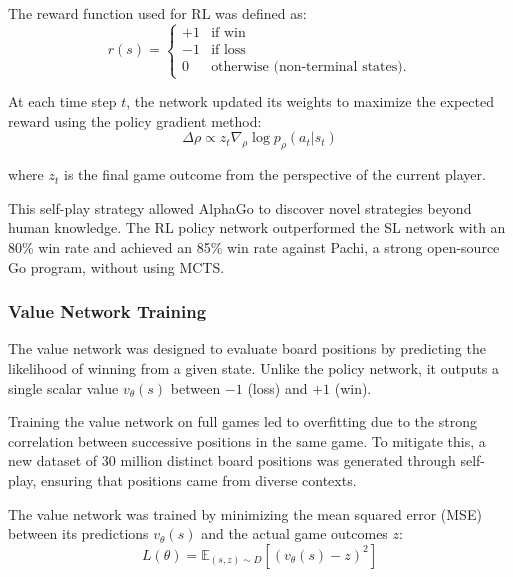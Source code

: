 The reward function used for RL was defined as:
\begin{equation}
    r(s) =
    \begin{cases}
        +1 & \text{if win}                           \\
        -1 & \text{if loss}                          \\
        0  & \text{otherwise (non-terminal states).}
    \end{cases}
\end{equation}

At each time step \( t \), the network updated its weights to maximize the
expected reward using the policy gradient method:
\begin{equation}
    \Delta \rho \propto z_t \nabla_\rho \log p_\rho(a_t | s_t)
\end{equation}

where \( z_t \) is the final game outcome from the perspective of the current
player.

This self-play strategy allowed AlphaGo to discover novel strategies beyond
human knowledge. The RL policy network outperformed the SL network with an 80\%
win rate and achieved an 85\% win rate against Pachi, a strong open-source Go
program, without using MCTS.

\subsubsection{Value Network Training}
The value network was designed to evaluate board positions by predicting the
likelihood of winning from a given state. Unlike the policy network, it outputs
a single scalar value \( v_\theta(s) \) between \(-1\) (loss) and \(+1\) (win).

Training the value network on full games led to overfitting due to the strong
correlation between successive positions in the same game. To mitigate this, a
new dataset of 30 million distinct board positions was generated through
self-play, ensuring that positions came from diverse contexts.

The value network was trained by minimizing the mean squared error (MSE)
between its predictions \( v_\theta(s) \) and the actual game outcomes \( z \):
\begin{equation}
    L(\theta) = \mathbb{E}_{(s, z) \sim D} \left[ (v_\theta(s) - z)^2 \right]
\end{equation}

